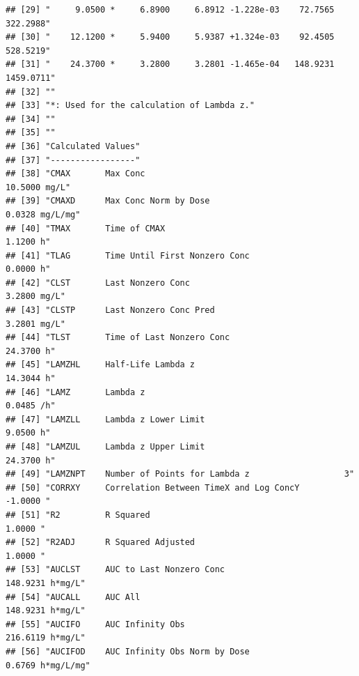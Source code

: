 \documentclass[12pt,]{krantz}
\begin{document}
\begin{verbatim}
## [29] "     9.0500 *     6.8900     6.8912 -1.228e-03    72.7565   322.2988"               
## [30] "    12.1200 *     5.9400     5.9387 +1.324e-03    92.4505   528.5219"               
## [31] "    24.3700 *     3.2800     3.2801 -1.465e-04   148.9231  1459.0711"               
## [32] ""                                                                                   
## [33] "*: Used for the calculation of Lambda z."                                           
## [34] ""                                                                                   
## [35] ""                                                                                   
## [36] "Calculated Values"                                                                  
## [37] "-----------------"                                                                  
## [38] "CMAX       Max Conc                                       10.5000 mg/L"             
## [39] "CMAXD      Max Conc Norm by Dose                           0.0328 mg/L/mg"          
## [40] "TMAX       Time of CMAX                                    1.1200 h"                
## [41] "TLAG       Time Until First Nonzero Conc                   0.0000 h"                
## [42] "CLST       Last Nonzero Conc                               3.2800 mg/L"             
## [43] "CLSTP      Last Nonzero Conc Pred                          3.2801 mg/L"             
## [44] "TLST       Time of Last Nonzero Conc                      24.3700 h"                
## [45] "LAMZHL     Half-Life Lambda z                             14.3044 h"                
## [46] "LAMZ       Lambda z                                        0.0485 /h"               
## [47] "LAMZLL     Lambda z Lower Limit                            9.0500 h"                
## [48] "LAMZUL     Lambda z Upper Limit                           24.3700 h"                
## [49] "LAMZNPT    Number of Points for Lambda z                   3"                       
## [50] "CORRXY     Correlation Between TimeX and Log ConcY        -1.0000 "                 
## [51] "R2         R Squared                                       1.0000 "                 
## [52] "R2ADJ      R Squared Adjusted                              1.0000 "                 
## [53] "AUCLST     AUC to Last Nonzero Conc                      148.9231 h*mg/L"           
## [54] "AUCALL     AUC All                                       148.9231 h*mg/L"           
## [55] "AUCIFO     AUC Infinity Obs                              216.6119 h*mg/L"           
## [56] "AUCIFOD    AUC Infinity Obs Norm by Dose                   0.6769 h*mg/L/mg"        

\end{verbatim}
\end{document}
